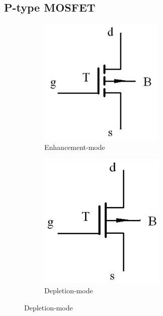 \subsection{P-type MOSFET}

\begin{figure}[H]
  \centering
  \begin{subfigure}{.45\textwidth}
    \centering
    \includegraphics[width=0.8\linewidth]{figures/EPMOS}
    \caption{Enhancement-mode}
  \end{subfigure}
  \begin{subfigure}{.45\textwidth}
    \centering
    \includegraphics[width=0.8\linewidth]{figures/DPMOS}
    \caption{Depletion-mode}
  \end{subfigure}
\end{figure}

